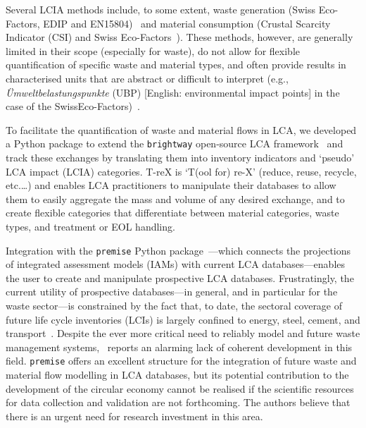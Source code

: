 \documentclass[a4paper,fleqn]{cas-dc}
\begin{document}
Several LCIA methods include, to some extent, waste generation (Swiss
Eco-Factors, EDIP and
EN15804)~\citep{foen2021ecofactors,hauschild2003edip,cen2019en15804} and
material consumption (Crustal Scarcity Indicator (CSI) and Swiss
Eco-Factors~\citep{arvidsson2020csi,foen2021ecofactors}). These methods,
however, are generally limited in their scope (especially for waste), do not
allow for flexible quantification of specific waste and material types, and
often provide results in characterised units that are abstract or difficult to
interpret (e.g., \textit{Ümweltbelastungspunkte} (UBP) [English: environmental impact points] in the case of the SwissEco-Factors)~\citep{su2020sustainableproddev}.

To facilitate the quantification of waste and material flows in LCA, we
developed a Python package to extend the \texttt{brightway} open-source LCA
framework~\citep{mutel2017brightway} and track these exchanges by translating
them into inventory indicators and `pseudo' LCA impact (LCIA) categories. T-reX
is `T(ool for) re-X' (reduce, reuse, recycle, etc.\@ \ldots) and enables LCA
practitioners to manipulate their databases to allow them to easily aggregate
the mass and volume of any desired exchange, and to create flexible categories
that differentiate between material categories, waste types, and treatment or
EOL handling.

Integration with the \texttt{premise} Python
package~\citep{sacchi2022premise}---which connects the projections of
integrated assessment models (IAMs) with current LCA databases---enables the
user to create and manipulate prospective LCA databases. Frustratingly, the
current utility of prospective databases---in general, and in particular for
the waste sector---is constrained by the fact that, to date, the sectoral
coverage of future life cycle inventories (LCIs) is largely confined to energy,
steel, cement, and transport~\citep{sacchi2023premisedocs}. Despite the ever
more critical need to reliably model and future waste management
systems,~\cite{bisinella2024wastelca} reports an alarming lack of coherent
development in this field. \texttt{premise} offers an excellent structure for
the integration of future waste and material flow modelling in LCA databases,
but its potential contribution to the development of the circular economy
cannot be realised if the scientific resources for data collection and
validation are not forthcoming. The authors believe that there is an urgent
need for research investment in this area.
\end{document}
